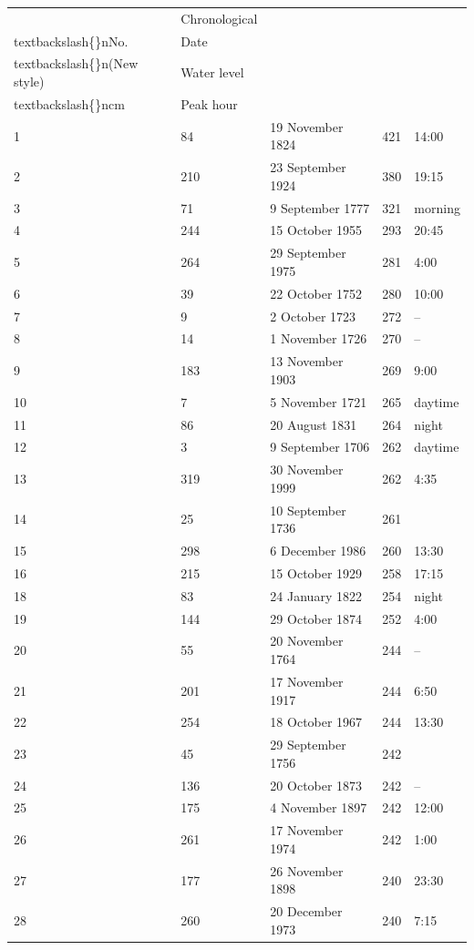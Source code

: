 \documentclass{article}
\begin{document}
\begin{tabular}{lllll}
\toprule
 & Chronological\\textbackslash\{\}nNo. & Date\\textbackslash\{\}n(New style) & Water level\\textbackslash\{\}ncm & Peak hour \\
\midrule
1 & 84 & 19 November 1824 & 421 & 14:00 \\
2 & 210 & 23 September 1924 & 380 & 19:15 \\
3 & 71 & 9 September 1777 & 321 & morning \\
4 & 244 & 15 October 1955 & 293 & 20:45 \\
5 & 264 & 29 September 1975 & 281 & 4:00 \\
6 & 39 & 22 October 1752 & 280 & 10:00 \\
7 & 9 & 2 October 1723 & 272 & – \\
8 & 14 & 1 November 1726 & 270 & – \\
9 & 183 & 13 November 1903 & 269 & 9:00 \\
10 & 7 & 5 November 1721 & 265 & daytime \\
11 & 86 & 20 August 1831 & 264 & night \\
12 & 3 & 9 September 1706 & 262 & daytime \\
13 & 319 & 30 November 1999 & 262 & 4:35 \\
14 & 25 & 10 September 1736 & 261 &  \\
15 & 298 & 6 December 1986 & 260 & 13:30 \\
16 & 215 & 15 October 1929 & 258 & 17:15 \\
18 & 83 & 24 January 1822 & 254 & night \\
19 & 144 & 29 October 1874 & 252 & 4:00 \\
20 & 55 & 20 November 1764 & 244 & – \\
21 & 201 & 17 November 1917 & 244 & 6:50 \\
22 & 254 & 18 October 1967 & 244 & 13:30 \\
23 & 45 & 29 September 1756 & 242 &  \\
24 & 136 & 20 October 1873 & 242 & – \\
25 & 175 & 4 November 1897 & 242 & 12:00 \\
26 & 261 & 17 November 1974 & 242 & 1:00 \\
27 & 177 & 26 November 1898 & 240 & 23:30 \\
28 & 260 & 20 December 1973 & 240 & 7:15 \\

\end{tabular}
\end{document}
